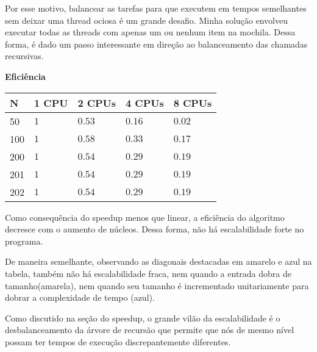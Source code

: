 \documentclass{article}
\begin{document}
Por esse motivo, balancear as tarefas
para que executem em tempos semelhantes sem deixar uma 
thread ociosa é um grande desafio. Minha solução envolveu
executar todas as threads com apenas um ou nenhum item na 
mochila. Dessa forma, é dado um passo interessante em direção 
ao balanceamento das chamadas recursivas.

\textbf{Eficiência}

\vspace{0.3cm}

\begin{tabular}{|l|l|l|l|l|}
\hline
N   & 1 CPU             & 2 CPUs            & 4 CPUs            & 8 CPUs \\ \hline
50  & $1$ & \cellcolor{yellow!50}$0.53$ & $0.16$ & $0.02$ \\ \hline
100 & $1$ & $0.58$ & \cellcolor{yellow!50}$0.33$ & $0.17$ \\ \hline
200 & $1$ & \cellcolor{blue!25}$0.54$ & $0.29$ & \cellcolor{yellow!50}$0.19$ \\ \hline
201 & $1$ & $0.54$ & \cellcolor{blue!25}$0.29$ & $0.19$ \\ \hline
202 & $1$ & $0.54$ & $0.29$ & \cellcolor{blue!25}$0.19$ \\ \hline
\end{tabular}
\vspace{0.3cm}

Como consequência do speedup menos que linear, a eficiência
do algoritmo decresce com o aumento de núcleos. Dessa forma,
não há escalabilidade forte no programa. 

De maneira semelhante, observando as diagonais destacadas em 
amarelo e azul na tabela, também não há escalabilidade fraca,
nem quando a entrada dobra de tamanho(amarela), nem quando seu tamanho
é incrementado unitariamente para dobrar a complexidade de tempo (azul).

Como discutido na seção do speedup, o grande vilão da escalabilidade
é o desbalanceamento da árvore de recursão que permite que nós de 
mesmo nível possam ter tempos de execução discrepantemente 
diferentes.
\end{document}

